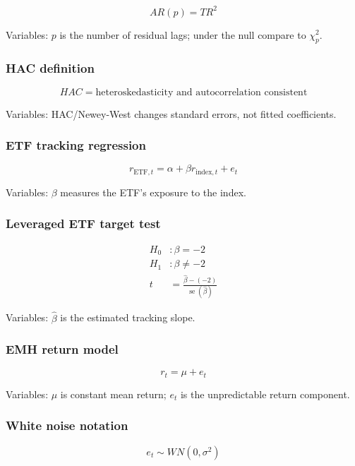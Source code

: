 \documentclass[
  8pt,
  twocolumn]{extarticle}
\begin{document}
\[
AR(p)=TR^2
\]

Variables: \(p\) is the number of residual lags; under the null compare
to \(\chi_p^2\).

\subsubsection{HAC definition}\label{hac-definition}

\[
HAC=\text{heteroskedasticity and autocorrelation consistent}
\]

Variables: HAC/Newey-West changes standard errors, not fitted
coefficients.

\subsubsection{ETF tracking regression}\label{etf-tracking-regression}

\[
r_{\text{ETF},t}=\alpha+\beta r_{\text{index},t}+e_t
\]

Variables: \(\beta\) measures the ETF's exposure to the index.

\subsubsection{Leveraged ETF target
test}\label{leveraged-etf-target-test}

\[
\begin{aligned}
H_0&:\beta=-2\\
H_1&:\beta\ne-2\\
t&=\frac{\hat\beta-(-2)}{\operatorname{se}(\hat\beta)}
\end{aligned}
\]

Variables: \(\hat\beta\) is the estimated tracking slope.

\subsubsection{EMH return model}\label{emh-return-model}

\[
r_t=\mu+e_t
\]

Variables: \(\mu\) is constant mean return; \(e_t\) is the unpredictable
return component.

\subsubsection{White noise notation}\label{white-noise-notation}

\[
e_t\sim WN(0,\sigma^2)
\]
\end{document}
